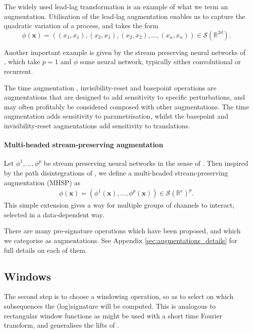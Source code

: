 \documentclass{article}
\theoremstyle{definition}
\theoremstyle{remark}
\newcommand{\reals}{\mathbb{R}}
\newcommand{\tseries}[1]{\mathcal{S}(#1)}
\begin{document}
	The widely used lead-lag transformation \citet{flint2016discretely, primer2016, yang2017leveraging} is an example of what we term an augmentation. Utilisation of the lead-lag augmentation enables us to capture the quadratic variation of a process, and takes the form
	\begin{equation*}
	\phi(\mathbf{x})= ((x_1,x_1),(x_2,x_1),(x_2,x_2),\dots,(x_n,x_n)) \in \tseries{\reals^{2d}}.
	\end{equation*}
	
	Another important example is given by the stream preserving neural networks of \citet{kidger2019deep}, which take $p=1$ and $\phi$ some neural network, typically either convolutional or recurrent.
	
	The time augmentation \citep{levin2013learning}, invisibility-reset \citep{yang2017leveraging} and basepoint \citep{signatory} operations are augmentations that are designed to add sensitivity to specific perturbations, and may often profitably be considered composed with other augmentations. The time augmentation adds sensitivity to parametrisation, whilst the basepoint and invisibility-reset augmentations add sensitivity to translations. 
	
	\paragraph{Multi-headed stream-preserving augmentation}
	Let $\phi^1, \ldots, \phi^p$ be stream preserving neural networks in the sense of \citet{kidger2019deep}. Then inspired by the path disintegrations of \citet{yang2017leveraging}, we define a multi-headed stream-preserving augmentation (MHSP) as
	\begin{align*}
	\phi(\mathbf{x}) = (\phi^1(\mathbf{x}), \dots, \phi^p(\mathbf{x})) \in \tseries{\reals^e}^p.
	\end{align*}
	This simple extension gives a way for multiple groups of channels to interact, selected in a data-dependent way.
	
	There are many pre-signature operations which have been proposed, and which we categorise as augmentations. See Appendix \ref{sec:augmentations_details} for full details on each of them.

	\subsection{Windows}\label{section:windows}
	The second step is to choose a windowing operation, so as to select on which subsequences the (log)signature will be computed. This is analogous to rectangular window functions as might be used with a short time Fourier transform, and generalises the lifts of \citet{kidger2019deep}.
	
\end{document}

